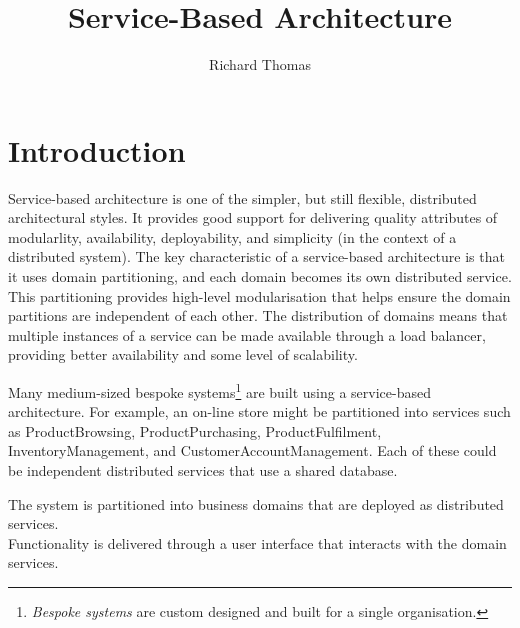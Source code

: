 \title{Service-Based Architecture}
\author{Richard Thomas}
\date{}

\maketitle

\section{Introduction}

Service-based architecture is one of the simpler, but still flexible, distributed architectural styles.
It provides good support for delivering quality attributes of modularlity, availability, deployability, and simplicity (in the context of a distributed system).
The key characteristic of a service-based architecture is that it uses domain partitioning, and each domain becomes its own distributed service.
This partitioning provides high-level modularisation that helps ensure the domain partitions are independent of each other.
The distribution of domains means that multiple instances of a service can be made available through a load balancer,
providing better availability and some level of scalability.

Many medium-sized bespoke systems\footnote{\emph{Bespoke systems} are custom designed and built for a single organisation.}
are built using a service-based architecture.
For example, an on-line store might be partitioned into services such as ProductBrowsing,
ProductPurchasing, ProductFulfilment, InventoryManagement, and CustomerAccountManagement.
Each of these could be independent distributed services that use a shared database.

\vspace{2mm}
\begin{definition}
    The system is partitioned into business domains that are deployed as distributed services.\\
    Functionality is delivered through a user interface that interacts with the domain services.
\end{definition}

